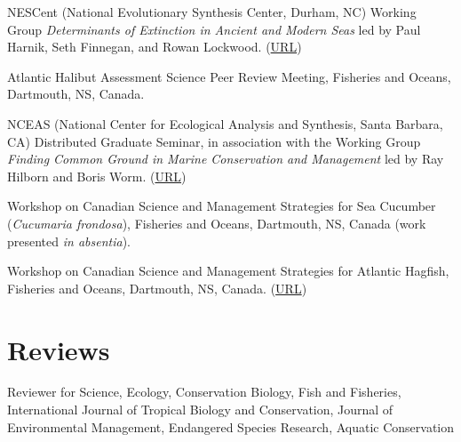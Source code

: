 \begin{description}
\itemsep3pt\parskip0pt
\item[2011--13]
NESCent (National Evolutionary Synthesis Center, Durham, NC) Working
Group \emph{Determinants of Extinction in Ancient and Modern Seas} led
by Paul Harnik, Seth Finnegan, and Rowan Lockwood.
(\href{http://www.nescent.org/science/awards_summary.php?id=256}{URL})
\item[2010]
Atlantic Halibut Assessment Science Peer Review Meeting, Fisheries and
Oceans, Dartmouth, NS, Canada.
\item[2007--09]
NCEAS (National Center for Ecological Analysis and Synthesis, Santa
Barbara, CA) Distributed Graduate Seminar, in association with the
Working Group \emph{Finding Common Ground in Marine Conservation and
Management} led by Ray Hilborn and Boris Worm.
(\href{http://www.nceas.ucsb.edu/projects/12307}{URL})
\item[2008]
Workshop on Canadian Science and Management Strategies for Sea Cucumber
(\emph{Cucumaria frondosa}), Fisheries and Oceans, Dartmouth, NS, Canada
(work presented \emph{in absentia}).
\item[2007]
Workshop on Canadian Science and Management Strategies for Atlantic
Hagfish, Fisheries and Oceans, Dartmouth, NS, Canada.
(\href{http://www.dfo-mpo.gc.ca/CSAS/Csas/Publications/Pro-CR/2009/2009_009_e.htm}{URL})
\end{description}

\section{Reviews}\label{reviews}

Reviewer for Science, Ecology, Conservation Biology, Fish and Fisheries,
International Journal of Tropical Biology and Conservation, Journal of
Environmental Management, Endangered Species Research, Aquatic
Conservation
